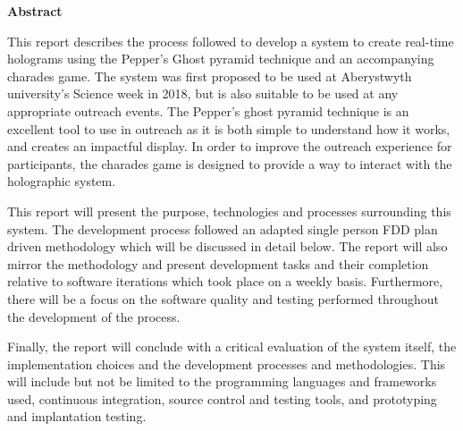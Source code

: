 \thispagestyle{empty}

\begin{center}
    {\LARGE\bf Abstract}
\end{center}

This report describes the process followed to develop a system to create real-time holograms using the Pepper's Ghost pyramid technique and an accompanying charades game. The system was first proposed to be used at Aberystwyth university's Science week in 2018, but is also suitable to be used at any appropriate outreach events. The Pepper’s ghost pyramid technique is an excellent tool to use in outreach as it is both simple to understand how it works, and creates an impactful display. In order to improve the outreach experience for participants, the charades game is designed to provide a way to interact with the holographic system.

This report will present the purpose, technologies and processes surrounding this system. The development process followed an adapted single person FDD plan driven methodology which will be discussed in detail below. The report will also mirror the methodology and present development tasks and their completion relative to software iterations which took place on a weekly basis. Furthermore, there will be a focus on the software quality and testing performed throughout the development of the process.

Finally, the report will conclude with a critical evaluation of the system itself, the implementation choices and the development processes and methodologies. This will include but not be limited to the programming languages and frameworks used, continuous integration, source control and testing tools, and prototyping and implantation testing.
